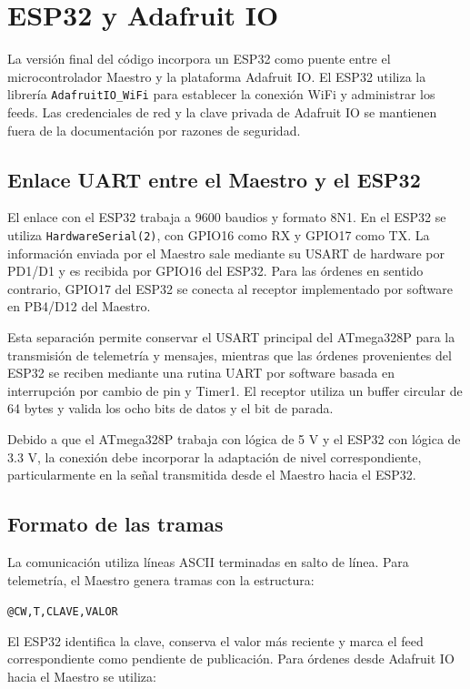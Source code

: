 \section{ESP32 y Adafruit IO}

La versión final del código incorpora un ESP32 como puente entre el microcontrolador Maestro y la plataforma Adafruit IO. El ESP32 utiliza la librería \texttt{AdafruitIO\_WiFi} para establecer la conexión WiFi y administrar los feeds. Las credenciales de red y la clave privada de Adafruit IO se mantienen fuera de la documentación por razones de seguridad.

\subsection{Enlace UART entre el Maestro y el ESP32}

El enlace con el ESP32 trabaja a 9600 baudios y formato 8N1. En el ESP32 se utiliza \texttt{HardwareSerial(2)}, con GPIO16 como RX y GPIO17 como TX. La información enviada por el Maestro sale mediante su USART de hardware por PD1/D1 y es recibida por GPIO16 del ESP32. Para las órdenes en sentido contrario, GPIO17 del ESP32 se conecta al receptor implementado por software en PB4/D12 del Maestro.

Esta separación permite conservar el USART principal del ATmega328P para la transmisión de telemetría y mensajes, mientras que las órdenes provenientes del ESP32 se reciben mediante una rutina UART por software basada en interrupción por cambio de pin y Timer1. El receptor utiliza un buffer circular de 64 bytes y valida los ocho bits de datos y el bit de parada.

Debido a que el ATmega328P trabaja con lógica de 5 V y el ESP32 con lógica de 3.3 V, la conexión debe incorporar la adaptación de nivel correspondiente, particularmente en la señal transmitida desde el Maestro hacia el ESP32.

\subsection{Formato de las tramas}

La comunicación utiliza líneas ASCII terminadas en salto de línea. Para telemetría, el Maestro genera tramas con la estructura:

\begin{center}
\texttt{@CW,T,CLAVE,VALOR}
\end{center}

El ESP32 identifica la clave, conserva el valor más reciente y marca el feed correspondiente como pendiente de publicación. Para órdenes desde Adafruit IO hacia el Maestro se utiliza:

